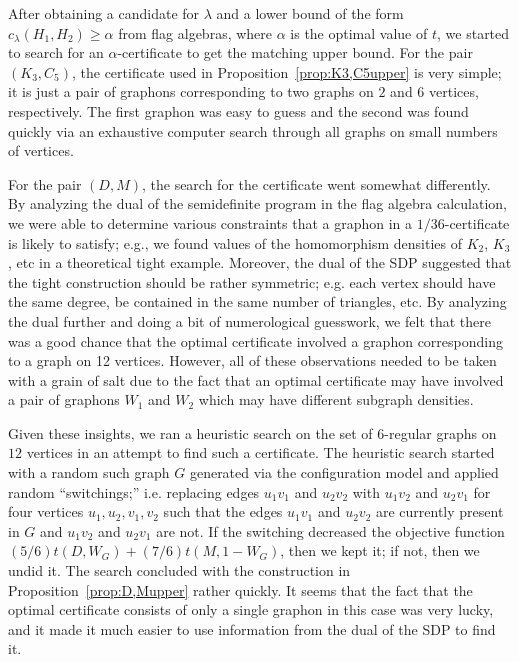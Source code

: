 \documentclass[12pt]{article}
\numberwithin{equation}{section}
\theoremstyle{definition}
\theoremstyle{remark}
\begin{document}
After obtaining a candidate for $\lambda$ and a lower bound of the form $c_\lambda(H_1,H_2)\geq \alpha$ from flag algebras, where $\alpha$ is the optimal value of $t$, we started to search for an $\alpha$-certificate to get the matching upper bound. For the pair $(K_3,C_5)$, the certificate used in Proposition~\ref{prop:K3,C5upper} is very simple; it is just a pair of graphons corresponding to two graphs on $2$ and $6$ vertices, respectively. The first graphon was easy to guess and the second was found quickly via an exhaustive computer search through all graphs on small numbers of vertices. 

For the pair $(D,M)$, the search for the certificate went somewhat differently. By analyzing the dual of the semidefinite program in the flag algebra calculation, we were able to determine various constraints that a graphon in a $1/36$-certificate is likely to satisfy; e.g., we found values of the homomorphism densities of $K_2$, $K_3$, etc in a theoretical tight example. Moreover, the dual of the SDP suggested that the tight construction should be rather symmetric; e.g. each vertex should have the same degree, be contained in the same number of triangles, etc. By analyzing the dual further and doing a bit of numerological guesswork, we felt that there was a good chance that the optimal certificate involved a graphon corresponding to a graph on 12 vertices. However, all of these observations needed to be taken with a grain of salt due to the fact that an optimal certificate may have involved a pair of graphons $W_1$ and $W_2$ which may have different subgraph densities. 

Given these insights, we ran a heuristic search on the set of $6$-regular graphs on $12$ vertices in an attempt to find such a certificate. The heuristic search started with a random such graph $G$ generated via the configuration model and applied random ``switchings;'' i.e. replacing edges $u_1v_1$ and $u_2v_2$ with $u_1v_2$ and $u_2v_1$ for four vertices $u_1,u_2,v_1,v_2$ such that the edges $u_1v_1$ and $u_2v_2$ are currently present in $G$ and $u_1v_2$ and $u_2v_1$ are not. If the switching decreased the objective function $(5/6)t(D,W_G)+(7/6)t(M,1-W_G)$, then we kept it; if not, then we undid it. The search concluded with the construction in Proposition~\ref{prop:D,Mupper} rather quickly. It seems that the fact that the optimal certificate consists of only a single graphon in this case was very lucky, and it made it much easier to use information from the dual of the SDP to find it. 
\end{document}
